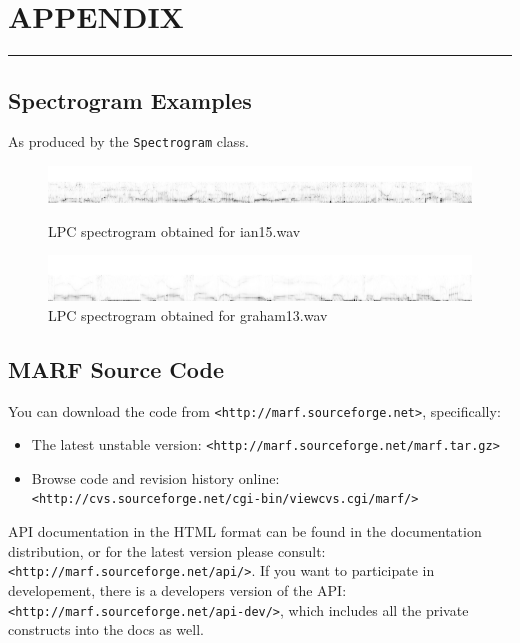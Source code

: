 \section{APPENDIX}
\noindent
\rule{7.0in}{.013in}

\begin{center}
	\subsection{Spectrogram Examples}\label{appx:spectra}
\end{center}

As produced by the \verb+Spectrogram+ class.

\begin{figure}[h]
	\centering
	\includegraphics[width=500pt]{../graphics/lpc_spectrograms/ian15_wav.png}
	\caption{LPC spectrogram obtained for ian15.wav}
	\includegraphics[width=500pt]{../graphics/lpc_spectrograms/graham13_wav.png}
	\caption{LPC spectrogram obtained for graham13.wav}
\end{figure}

\begin{center}
	\subsection{MARF Source Code}
\end{center}

You can download
the code from \verb+<http://marf.sourceforge.net>+, specifically:

\begin{itemize}
\item The latest unstable version: \verb+<http://marf.sourceforge.net/marf.tar.gz>+
\item Browse code and revision history online: \verb+<http://cvs.sourceforge.net/cgi-bin/viewcvs.cgi/marf/>+
\end{itemize}

API documentation in the HTML format can be found in the documentation
distribution, or for the latest version please consult:
\verb+<http://marf.sourceforge.net/api/>+. If you want to participate
in developement, there is a developers version of the API:
\verb+<http://marf.sourceforge.net/api-dev/>+, which includes
all the private constructs into the docs as well.

